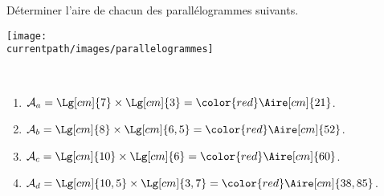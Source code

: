 \begin{exercice*}
   Déterminer l'aire de chacun des parallélogrammes suivants.
   \begin{center}
      \texttt{[image: \\currentpath/images/parallelogrammes]}
   \end{center}
\end{exercice*}
\begin{corrige}
   \ \\ [-5mm]
   \begin{enumerate}
      \item $\mathcal{A}_a =\Lg[cm]{7}\times\Lg[cm]{3} =\color{red} \Aire[cm]{21}$.
      \item $\mathcal{A}_b =\Lg[cm]{8}\times\Lg[cm]{6,5} =\color{red} \Aire[cm]{52}$.
      \item $\mathcal{A}_c =\Lg[cm]{10}\times\Lg[cm]{6} =\color{red} \Aire[cm]{60}$.
      \item $\mathcal{A}_d =\Lg[cm]{10,5}\times\Lg[cm]{3,7} =\color{red} \Aire[cm]{38,85}$.
   \end{enumerate}
\end{corrige}
